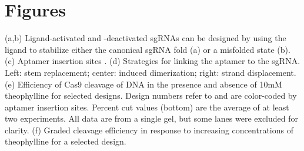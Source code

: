 \documentclass[10pt,oneside]{article}
\begin{document}
% 
% 

\section{Figures}



 (a,b) Ligand-activated and -deactivated sgRNAs can be designed by using the ligand to stabilize either the canonical sgRNA fold (a) or a misfolded state (b).
%
%
 (c) Aptamer insertion sites \autocite{briner2014}.
%
%
% 
%
 (d) Strategies for linking the aptamer to the sgRNA.  Left: stem replacement; center: induced dimerization; right: strand displacement.
%
%
% 
%
 (e) Efficiency of \invitro{} Cas9 cleavage of DNA in the presence and absence of 10mM theophylline for selected designs.  Design numbers refer to  and are color-coded by aptamer insertion sites.  Percent cut values (bottom) are the average of at least two experiments.  All data are from a single gel, but some lanes were excluded for clarity.
%
%
% 
%
 (f) Graded cleavage efficiency in response to increasing concentrations of theophylline for a selected design.


\end{document}
